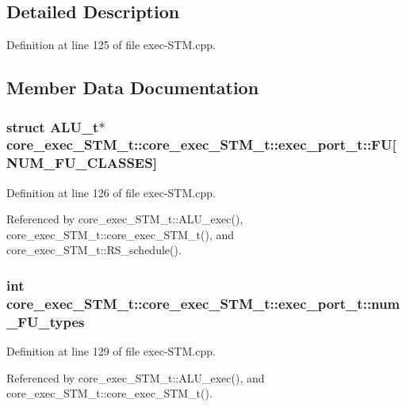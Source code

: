 \subsection{Detailed Description}


Definition at line 125 of file exec-STM.cpp.

\subsection{Member Data Documentation}
\subsubsection[{FU}]{\setlength{\rightskip}{0pt plus 5cm}struct {\bf ALU\_\-t}$\ast$ core\_\-exec\_\-STM\_\-t::core\_\-exec\_\-STM\_\-t::exec\_\-port\_\-t::FU[NUM\_\-FU\_\-CLASSES]\hspace{0.3cm}{\tt  [read]}}\label{structcore__exec__STM__t_1_1exec__port__t_dc1c2cd10b5cc74bcd2aa34bda3c2d5e}




Definition at line 126 of file exec-STM.cpp.

Referenced by core\_\-exec\_\-STM\_\-t::ALU\_\-exec(), core\_\-exec\_\-STM\_\-t::core\_\-exec\_\-STM\_\-t(), and core\_\-exec\_\-STM\_\-t::RS\_\-schedule().
\subsubsection[{num\_\-FU\_\-types}]{\setlength{\rightskip}{0pt plus 5cm}int core\_\-exec\_\-STM\_\-t::core\_\-exec\_\-STM\_\-t::exec\_\-port\_\-t::num\_\-FU\_\-types}\label{structcore__exec__STM__t_1_1exec__port__t_368c7075f021d8065df66ac0365680a3}




Definition at line 129 of file exec-STM.cpp.

Referenced by core\_\-exec\_\-STM\_\-t::ALU\_\-exec(), and core\_\-exec\_\-STM\_\-t::core\_\-exec\_\-STM\_\-t().
